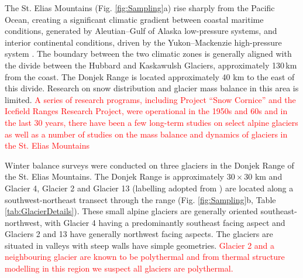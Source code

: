 \documentclass[twocolumn, letterpaper]{igs}
\begin{document}
The St. Elias Mountains (Fig. \ref{fig:Sampling}a) rise sharply from the Pacific Ocean, creating a significant climatic gradient between coastal maritime conditions, generated by Aleutian--Gulf of Alaska low-pressure systems, and interior continental conditions, driven by the Yukon--Mackenzie high-pressure system \citep{Taylor1969}. The boundary between the two climatic zones is generally aligned with the divide between the Hubbard and Kaskawulsh Glaciers, approximately 130\,km from the coast. The Donjek Range is located approximately 40 km to the east of this divide. Research on snow distribution and glacier mass balance in this area is limited. \textcolor{red}{A series of research programs, including Project ``Snow Cornice''  and the Icefield Ranges Research Project, were operational in the 1950s and 60s \citep{Wood1948, Danby2003} and in the last 30 years, there have been a few long-term studies on select alpine glaciers \citep[e.g.][]{Clarke2014} as well as a number of studies on the mass balance and dynamics of glaciers in the St. Elias Mountains \citep[e.g.][]{Arendt2008, Burgess2013,Waechter2015}}

Winter balance surveys were conducted on three glaciers in the Donjek Range of the St. Elias Mountains. The Donjek Range is approximately $30\times30$ km and Glacier 4, Glacier 2 and Glacier 13 (labelling adopted from \cite{Crompton2016}) are located along a southwest-northeast transect through the range (Fig. \ref{fig:Sampling}b, Table \ref{tab:GlacierDetails}). These small alpine glaciers are generally oriented southeast-northwest, with Glacier 4 having a predominantly southeast facing aspect and Glaciers 2 and 13 have generally northwest facing aspects. The glaciers are situated in valleys with steep walls have simple geometries. \textcolor{red}{Glacier 2 and a neighbouring glacier are known to be polythermal \citep{Wilson2013} and from thermal structure modelling in this region \citep{Wilson2013a} we suspect all glaciers are polythermal. }
\end{document}

